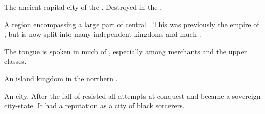 \begin{gloss}
\begin{subgloss}
  \begin{comment}
  \subparagraph{\ShiinMerodar}
  \end{comment}
  \gitem{\ShiinMerodar}
  The ancient capital city of the \VaimonCaliphate.
  Destroyed in the . 
\end{subgloss}









\begin{comment}
\paragraph{\Velcad}
\end{comment}
\gitem{\Velcad}
A region encompassing a large part of central \Azmith. 
This was previously the empire of , but is now split into many independent kingdoms and much \Wylde{}. 

The \Velcadian{} tongue is spoken in much of \Velcad{}, especially among merchants and the upper classes. 









\begin{comment}
\paragraph{\Vidra}
\end{comment}
\gitem{\Vidra}
An island kingdom in the northern . 









\begin{comment}
\paragraph{Yormis}
\end{comment}
\gitem{\Yormis}
An \Ortaican city. 
After the fall of \Ortaica \Yormis resisted all attempts at conquest and became a sovereign city-state. 
It had a reputation as a city of black sorcerers. 









\end{gloss}



















